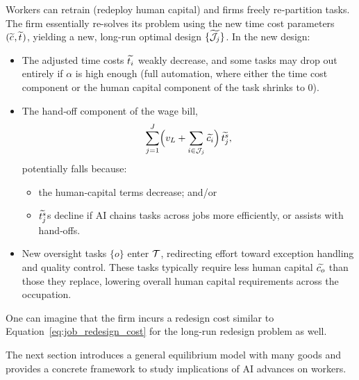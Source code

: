 \documentclass{article}
\theoremstyle{plain}
\theoremstyle{plain}
\begin{document}
Workers can retrain (redeploy human capital) and firms freely re‐partition tasks.
The firm essentially re-solves its problem using the new time cost parameters \((\widetilde{c_{}}, \widetilde{t_{}})\), yielding a new, long-run optimal design \(\{\widetilde{\mathcal{J}_j}\}\).  
In the new design:
\begin{itemize}
  \item The adjusted time costs \(\widetilde{t_{i}}\) weakly decrease, and some tasks may drop out entirely if $\alpha$ is high enough (full automation, where either the time cost component or the human capital component of the task shrinks to 0).
  \item The hand‐off component of the wage bill,
  \[
    \sum_{j=1}^J \Bigl(v_L + \sum_{i\in\mathcal{J}_j}\widetilde{c_{i}}\Bigr)\,\widetilde{t^{s}_{j}},
  \]
  potentially falls because:
  \begin{itemize}
    \item the human‐capital terms decrease; and/or
    \item \(\widetilde{t^{s}_{j}}\)s decline if AI chains tasks across jobs more efficiently, or assists with hand‐offs.
  \end{itemize}
  \item New oversight tasks \(\{o\}\) enter \(\mathcal{T}\), redirecting effort toward exception handling and quality control. These tasks typically require less human capital \(\widetilde{c_{o}}\) than those they replace, lowering overall human capital requirements across the occupation.
\end{itemize}
One can imagine that the firm incurs a redesign cost similar to Equation~\ref{eq:job_redesign_cost} for the long-run redesign problem as well.

The next section introduces a general equilibrium model with many goods and provides a concrete framework to study implications of AI advances on workers.
\end{document}
